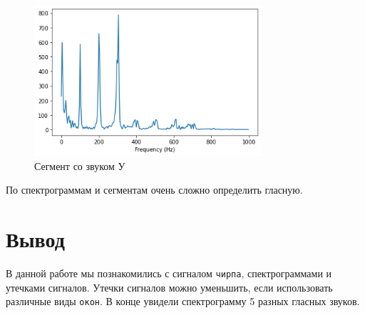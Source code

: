 \documentclass[a4paper, 12pt]{report}
\begin{document}
	\begin{figure}[H]
		\centering
		\includegraphics[width=0.75\textwidth]{word5.png}
		\caption{Сегмент со звуком У}
		\label{fig:word5}
	\end{figure}
	По спектрограммам и сегментам очень сложно определить гласную.

	\chapter{Вывод}
	В данной работе мы познакомились с сигналом \texttt{чирпа}, спектрограммами и утечками сигналов. Утечки сигналов можно уменьшить, если использовать различные виды \texttt{окон}. В конце увидели спектрограмму 5 разных гласных звуков.
\end{document}
